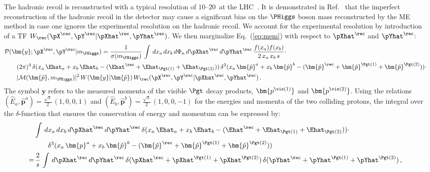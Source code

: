 The hadronic recoil is reconstructed with a typical resolution of $10$--$20$~\GeV at the LHC~\cite{CMS-JME-13-003,ATLAS-CONF-2014-019}.
It is demonstrated in Ref.~\cite{Alwall:2010cq} that the imperfect reconstruction of the hadronic recoil
in the detector may cause a significant bias on the $\PHiggs$ boson mass reconstructed by the ME method in case one ignores
the experimental resolution on the
hadronic recoil. We account
for the experimental resolution by introduction
of a TF $W_{\rec}( \pX^{\rec}, \pY^{\rec} | \pXhat^{\rec},
\pYhat^{\rec} )$.
We then marginalize Eq.~(\ref{eq:mem}) with respect to $\pXhat^{\rec}$ and $\pYhat^{\rec}$:
\begin{align}
& \mathcal{P}(\bm{y};\pX^{\rec},\pY^{\rec}|m_{\PHiggs}) =
\frac{1}{\sigma(m_{\PHiggs})} \, \int \, dx_{a} \, dx_{b} \, d\Phi_{n} \,
d\pXhat^{\rec} \, d\pYhat^{\rec} \, \frac{f(x_{a}) f(x_{b})}{2 \,
  x_{a} \, x_{b} \, s} \cdot \nonumber \\
& \qquad (2\pi)^{4} \, \delta( x_{a} \, \Ehat_{a} + x_{b} \, \Ehat_{b} -
(\Ehat^{\rec} + \Ehat_{\Pgt(1)} + \Ehat_{\Pgt(2)}) ) \, \delta^{3}( x_{a} \,
\bm{\hat{p}}^{a} + x_{b} \, \bm{\hat{p}}^{b} - (\bm{\hat{p}}^{\rec} + \bm{\hat{p}}^{\Pgt(1)}
+ \bm{\hat{p}}^{\Pgt(2)}) ) \cdot \nonumber \\
& \qquad \vert \mathcal{M}(\bm{\tilde{p}},m_{\PHiggs}) \vert^{2} \, W(\bm{y}|\bm{\hat{p}}) \, W_{\rec}( \pX^{\rec}, \pY^{\rec} | \pXhat^{\rec}, \pYhat^{\rec} ) \, .
\label{eq:mem_mod_hadRecoil}
\end{align}
The symbol $\bm{y}$ refers to the measured momenta of the visible $\Pgt$ decay products, $\bm{p^{\vis(1)}}$ and $\bm{p^{\vis(2)}}$.
Using the relations $(\hat{E}_{a},\bm{\hat{p}}^{a}) = \frac{\sqrt{s}}{2} \, (1, 0,
0, 1)$ and $(\hat{E}_{b},\bm{\hat{p}}^{b}) = \frac{\sqrt{s}}{2} \, (1,
0, 0, -1)$
for the energies and momenta of the two colliding protons,
the integral over the $\delta$-function that ensures the conservation of energy and momentum can be expressed by:
\begin{align}
& \int \, dx_{a} \, dx_{b} \, d\pXhat^{\rec} \, d\pYhat^{\rec} \, \delta(
x_{a} \, \Ehat_{a} + x_{b} \, \Ehat_{b} - (\Ehat^{\rec} +
\Ehat_{\Pgt(1)} + \Ehat_{\Pgt(2)})) \cdot \nonumber \\
& \qquad \delta^{3}(
x_{a} \, \bm{p}^{a} + x_{b} \, \bm{\hat{p}}^{b} - (\bm{\hat{p}}^{\rec} +
\bm{\hat{p}}^{\Pgt(1)} + \bm{\hat{p}}^{\Pgt(2)})) \nonumber \\
= & \, \frac{2}{s} \, \int \,
d\pXhat^{\rec} \, d\pYhat^{\rec} \, 
\delta( \pXhat^{\rec} + \pXhat^{\Pgt(1)} + \pXhat^{\Pgt(2)} ) \,
\delta( \pYhat^{\rec} + \pYhat^{\Pgt(1)} + \pYhat^{\Pgt(2)} ) \, ,
\label{eq:delta4}
\end{align}

